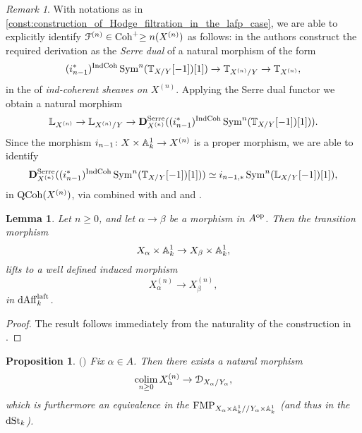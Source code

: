 \documentclass[10pt,a4paper,reqno]{amsart} %
\theoremstyle{plain}
\newtheorem{lem}[thm]{Lemma}
\newtheorem{prop}[thm]{Proposition}
\theoremstyle{definition}
\theoremstyle{remark}
\newtheorem{rem}[thm]{Remark}
\numberwithin{equation}{section}
\begin{document}
\begin{rem} \label{rem:identification_of_equivalence_of_derivation_used_in_the_construction_of_the_Hodge_filtration}
    With notations as in \cref{const:construction_of_Hodge_filtration_in_the_lafp_case}, we are able to explicitly identify $\mathcal F^{(n)} \in \mathrm{Coh}^+{\ge n}(X^{(n)})$ as
    follows: in \cite[\S 9.5.1]{Gaitsgory_Study_II} the authors construct the required derivation as the \emph{Serre dual} of a natural morphism of the form
        \[
            (i_{n-1}^*)^{\mathrm{IndCoh}}  \operatorname{Sym}^n(\mathbb T_{X/ Y}[-1])[1]) \to \mathbb T_{X^{(n)}/ Y} \to \mathbb T_{X^{(n)}},
        \]
    in the \infcat of \emph{ind-coherent sheaves on $X^{(n)}$}. Applying the Serre dual functor we obtain a natural morphism
        \[
            \mathbb L_{X^{(n)}} \to \mathbb L_{X^{(n)}/ Y} \to \mathbf D^{\mathrm{Serre}}_{X^{(n)}} ( (i_{n-1}^*)^{\mathrm{IndCoh}}  \operatorname{Sym}^n(\mathbb T_{X/ Y}[-1])[1])) .
        \]
    Since the morphism $i_{n-1} \colon X \times \mathbb A^1_k \to X^{(n)}$ is a proper morphism, we are able to identify 
        \[
            \mathbf D^{\mathrm{Serre}}_{X^{(n)}} ( (i_{n-1}^*)^{\mathrm{IndCoh}}  \operatorname{Sym}^n(\mathbb T_{X/ Y}[-1])[1])) \simeq i_{n-1, *} \operatorname{Sym}^n(\mathbb L_{X/ Y}[-1])[1]),
        \]
    in $\mathrm{QCoh}(X^{(n)})$, via \cite[Corollary 9.5.9 (b)]{Gaitsgory_IndCoh} combined with and \cite[\S 3.6.6]{Gaitsgory_IndCoh} and \cite[Corollary 1.4.4.2]{Gaitsgory_Study_II}.
\end{rem}

\begin{lem} \label{lem:naturality_of_Hodge_filtration_w.r.t_Noetherian_approximation}
    Let  $n \ge 0$, and let $\alpha \to \beta$ be a morphism in $A ^\mathrm{op}$. Then the transition morphism
        \[
            X_\alpha \times \mathbb A^1_k \to X_\beta \times \mathbb A^1_k,  
        \]
    lifts to a well defined induced morphism
        \[
            X_\alpha^{(n)} \to X_\beta^{(n)},
        \]
    in $\mathrm{dAff}_k^{\mathrm{laft}}$.
\end{lem}

\begin{proof}
    The result follows immediately from the naturality of the construction in \cite[\S 9.5.1]{Gaitsgory_Study_II}.
\end{proof}

\begin{prop}$\mathrm{(}$\cite[Corollary 9.5.2]{Gaitsgory_Study_II}$\mathrm{)}$ \label{prop:computation_of_filtered_colimit_of_the_X_alpha^n} Fix $\alpha \in A$. Then there exists a natural morphism
    \[\operatorname*{colim}_{n \ge 0} X_\alpha^{(n)} \to \mathcal D_{X_\alpha/ Y_\alpha},\]
    which is furthermore an equivalence in the \infcat $\mathrm{FMP}_{X_\alpha \times \mathbb A^1_k/ /Y_\alpha \times \mathbb A^1_k}$ (and thus in the \infcat $\mathrm{dSt}_k$).
\end{prop}
\end{document}
